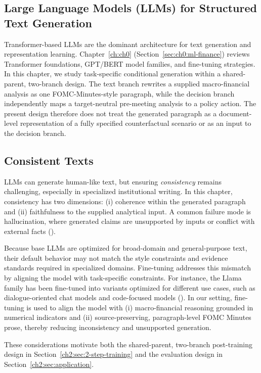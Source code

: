 \subsection*{Large Language Models (LLMs) for Structured Text Generation}\label{ch2:sec:lr:llm}


Transformer-based LLMs are the dominant architecture for text generation and representation learning. Chapter~\ref{ch:ch0} (Section~\ref{sec:ch0:ml-finance}) reviews Transformer foundations, GPT/BERT model families, and fine-tuning strategies. In this chapter, we study task-specific conditional generation within a shared-parent, two-branch design. The text branch rewrites a supplied macro-financial analysis as one FOMC-Minutes-style paragraph, while the decision branch independently maps a target-neutral pre-meeting analysis to a policy action. The present design therefore does not treat the generated paragraph as a document-level representation of a fully specified counterfactual scenario or as an input to the decision branch.


\subsection*{Consistent Texts}\label{ch2:sec:lr:text}


LLMs can generate human-like text, but ensuring \textit{consistency} remains challenging, especially in specialized institutional writing. In this chapter, consistency has two dimensions: (i) coherence within the generated paragraph and (ii) faithfulness to the supplied analytical input. A common failure mode is hallucination, where generated claims are unsupported by inputs or conflict with external facts (\cite{huang2025survey}).

Because base LLMs are optimized for broad-domain and general-purpose text, their default behavior may not match the style constraints and evidence standards required in specialized domains. Fine-tuning addresses this mismatch by aligning the model with task-specific constraints. For instance, the Llama family has been fine-tuned into variants optimized for different use cases, such as dialogue-oriented chat models and code-focused models (\cite{llama-recips}). In our setting, fine-tuning is used to align the model with (i) macro-financial reasoning grounded in numerical indicators and (ii) source-preserving, paragraph-level FOMC Minutes prose, thereby reducing inconsistency and unsupported generation.

These considerations motivate both the shared-parent, two-branch post-training design in Section~\ref{ch2:sec:2-step-training} and the evaluation design in Section~\ref{ch2:sec:application}.
